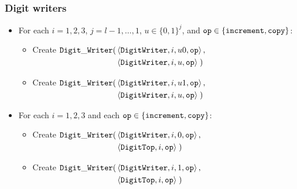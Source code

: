 \subsubsection{ Digit writers }

\begin{itemize}

    \item For each $i = 1,2,3$,
                   $j = l-1,\ldots,1$,
                   $u \in \{0, 1\}^j$, and
                   ${\tt op} \in \{{\tt increment}, {\tt copy} \}$:
        \begin{itemize}
        \item Create
            $\begin{aligned}[t]
                {\tt Digit\_Writer}(& \left\langle {\tt DigitWriter}, i, u0, {\tt op} \right\rangle, \\
                        & \left\langle {\tt DigitWriter},  i, u,  {\tt op} \right\rangle \;)
            \end{aligned}$

        \item Create
        $\begin{aligned}[t]
            {\tt Digit\_Writer}(& \left\langle {\tt DigitWriter},    i,  u1, {\tt op} \right\rangle, \\
                        & \left\langle {\tt DigitWriter}, i,  u,  {\tt op} \right\rangle \;)
        \end{aligned}$

        \end{itemize}

    \item For each $i = 1,2,3$ and each ${\tt op} \in \{{\tt increment}, {\tt copy} \}$:
    \begin{itemize}
        \item Create
            $\begin{aligned}[t]
                {\tt Digit\_Writer}(& \left\langle {\tt DigitWriter}, i, 0, {\tt op} \right\rangle, \\
                         & \left\langle {\tt DigitTop}, i, {\tt op} \right\rangle \;)
            \end{aligned}$

        \item Create
        $\begin{aligned}[t]
            {\tt Digit\_Writer}(& \left\langle {\tt DigitWriter}, i, 1, {\tt op}\right\rangle, \\
                     & \left\langle {\tt DigitTop},    i,    {\tt op}\right\rangle \;)
        \end{aligned}$
        \end{itemize}


\end{itemize}

